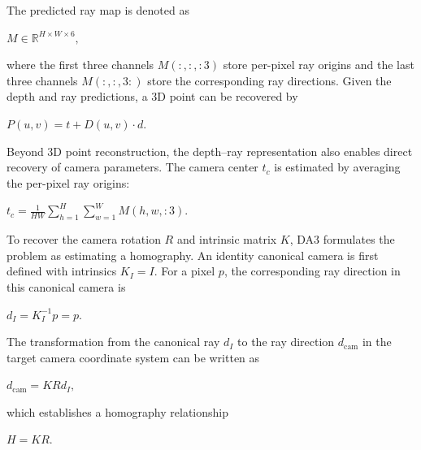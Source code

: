 The predicted ray map is denoted as
\begin{center}
    $\displaystyle M \in \mathbb{R}^{H \times W \times 6}, $
\end{center}
where the first three channels $M(:,:,:3)$ store per-pixel ray origins and the last three channels $M(:,:,3:)$ store the corresponding ray directions. Given the depth and ray predictions, a 3D point can be recovered by
\begin{center}
    $\displaystyle P(u,v) = t + D(u,v) \cdot d. $
\end{center}

Beyond 3D point reconstruction, the depth--ray representation also enables direct recovery of camera parameters. The camera center $t_c$ is estimated by averaging the per-pixel ray origins:
\begin{center}
    $\displaystyle t_c = \frac{1}{HW} \sum_{h=1}^{H} \sum_{w=1}^{W} M(h,w,:3). $
\end{center}

To recover the camera rotation $R$ and intrinsic matrix $K$, DA3 formulates the problem as estimating a homography. An identity canonical camera is first defined with intrinsics $K_I=I$. For a pixel $p$, the corresponding ray direction in this canonical camera is
\begin{center}
    $\displaystyle d_I = K_I^{-1} p = p. $
\end{center}
The transformation from the canonical ray $d_I$ to the ray direction $d_{\text{cam}}$ in the target camera coordinate system can be written as
\begin{center}
    $\displaystyle d_{\text{cam}} = KR d_I, $
\end{center}
which establishes a homography relationship
\begin{center}
    $\displaystyle H = KR. $
\end{center}

